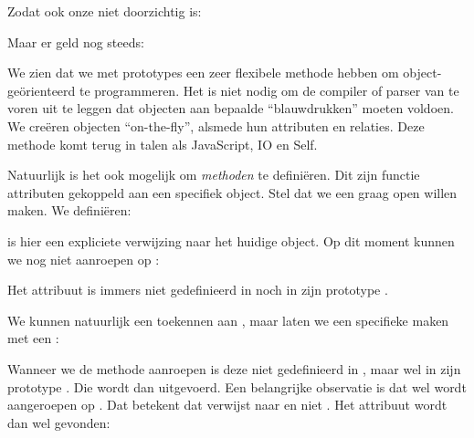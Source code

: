 Zodat ook onze  niet doorzichtig is:


Maar er geld nog steeds:


We zien dat we met prototypes een zeer flexibele methode hebben om object-geörienteerd te programmeren. Het is niet nodig om de compiler of parser van te voren uit te leggen dat objecten aan bepaalde ``blauwdrukken'' moeten voldoen. We creëren objecten ``on-the-fly'', alsmede hun attributen en relaties. Deze methode komt terug in talen als JavaScript, IO en Self.

Natuurlijk is het ook mogelijk om \emph{methoden} te definiëren. Dit zijn functie attributen gekoppeld aan een specifiek object. Stel dat we een  graag open willen maken. We definiëren:


 is hier een expliciete verwijzing naar het huidige object. Op dit moment kunnen we  nog niet aanroepen op :


Het attribuut  is immers niet gedefinieerd in  noch in zijn prototype .

We kunnen natuurlijk een  toekennen aan , maar laten we een specifieke  maken met een :


Wanneer we de methode  aanroepen is deze niet gedefinieerd in , maar wel in zijn prototype . Die wordt dan uitgevoerd. Een belangrijke observatie is dat  wel wordt aangeroepen op . Dat betekent dat  verwijst naar  en niet . Het attribuut  wordt dan wel gevonden:


